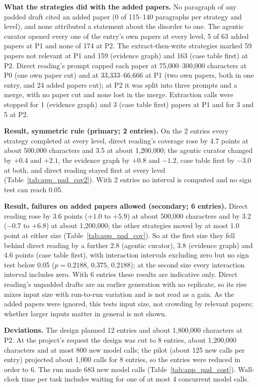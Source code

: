 \documentclass{article} %
\begin{document}
\textbf{What the strategies did with the added papers.} No paragraph of any padded draft cited an added paper (0 of 115--140 paragraphs per strategy and level), and none attributed a statement about the disorder to one. The agentic curator opened every one of the entry's own papers at every level, 5 of 63 added papers at P1 and none of 174 at P2. The extract-then-write strategies marked 59 papers not relevant at P1 and 159 (evidence graph) and 163 (case table first) at P2. Direct reading's prompt capped each paper at 75,000--300,000 characters at P0 (one own paper cut) and at 33,333--66,666 at P1 (two own papers, both in one entry, and 24 added papers cut); at P2 it was split into three prompts and a merge, with no paper cut and none lost in the merge. Extraction calls were stopped for 1 (evidence graph) and 3 (case table first) papers at P1 and for 3 and 5 at P2.

\textbf{Result, symmetric rule (primary; 2 entries).} On the 2 entries every strategy completed at every level, direct reading's coverage rose by 4.7 points at about 500,000 characters and 3.5 at about 1,200,000; the agentic curator changed by $+0.4$ and $+2.1$, the evidence graph by $+0.8$ and $-1.2$, case table first by $-3.0$ at both, and direct reading stayed first at every level (Table~\ref{tab:app_pad_cov2}). With 2 entries no interval is computed and no sign test can reach 0.05.

\textbf{Result, failures on added papers allowed (secondary; 6 entries).} Direct reading rose by 3.6 points ($+1.0$ to $+5.9$) at about 500,000 characters and by 3.2 ($-0.7$ to $+6.8$) at about 1,200,000; the other strategies moved by at most 1.0 point at either size (Table~\ref{tab:app_pad_cov}). So at the first size they fell behind direct reading by a further 2.8 (agentic curator), 3.8 (evidence graph) and 4.6 points (case table first), with interaction intervals excluding zero but no sign test below 0.05 ($p=0.2188$, $0.375$, $0.2188$); at the second size every interaction interval includes zero. With 6 entries these results are indicative only. Direct reading's unpadded drafts are an earlier generation with no replicate, so its rise mixes input size with run-to-run variation and is not read as a gain. As the added papers were ignored, this tests input size, not crowding by relevant papers; whether larger inputs matter in general is not shown.

\textbf{Deviations.} The design planned 12 entries and about 1,800,000 characters at P2. At the project's request the design was cut to 8 entries, about 1,200,000 characters and at most 800 new model calls; the pilot (about 125 new calls per entry) projected about 1,000 calls for 8 entries, so the entries were reduced in order to 6. The run made 683 new model calls (Table~\ref{tab:app_pad_cost}). Wall-clock time per task includes waiting for one of at most 4 concurrent model calls.
\end{document}

